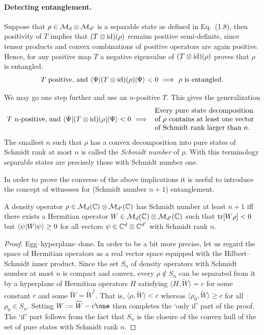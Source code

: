 \documentclass[11pt,a4paper]{article}
\numberwithin{equation}{section}
\begin{document}
\paragraph{Detecting entanglement.}
Suppose that $\rho\in \mathcal{M}_d\otimes \mathcal{M}_{d'}$ is a separable state as defined in Eq.~(1.8), then positivity of $T$
implies that $(T\otimes \mathrm{id})(\rho)$ remains positive semi-definite, since tensor products and convex combinations of
positive operators are again positive. Hence, for any positive map $T$ a negative eigenvalue of $(T\otimes \mathrm{id})(\rho)$
proves that $\rho$ is entangled:
\begin{equation}\label{eq:ch3:3.12}
    T\ \text{positive, and}\ \langle\Psi|(T\otimes \mathrm{id})(\rho)|\Psi\rangle<0 \ \Longrightarrow\ \rho\ \text{is entangled.}
\end{equation}

We may go one step further and use an $n$-positive $T$. This gives the generalization
\[
    T\ \text{$n$-positive, and}\ \bra{\Psi}(T\otimes \id)(\rho)\ket{\Psi}<0
    \ \Longrightarrow\
    \begin{array}{l}
        \text{Every pure state decomposition}         \\
        \text{of $\rho$ contains at least one vector} \\
        \text{of Schmidt rank larger than $n$.}
    \end{array}
\]
The smallest $n$ such that $\rho$ has a convex decomposition into pure states of Schmidt rank at most $n$ is called
the \emph{Schmidt number} of $\rho$. With this terminology separable states are precisely those with Schmidt number
one.

In order to prove the converse of the above implications it is useful to introduce the concept of witnesses for
(Schmidt number $n+1$) entanglement.

\begin{proposition}
    A density operator $\rho\in \mathcal{M}_d(\mathbb{C})\otimes \mathcal{M}_{d'}(\mathbb{C})$ has Schmidt number at least $n+1$ iff there exists a
    Hermitian operator $W\in \mathcal{M}_d(\mathbb{C})\otimes \mathcal{M}_{d'}(\mathbb{C})$ such that $\operatorname{tr}[W\rho]<0$ but
    $\langle\psi|W|\psi\rangle\ge 0$ for all vectors $\psi\in \mathbb{C}^d\otimes \mathbb{C}^{d'}$ with Schmidt rank $n$.
\end{proposition}

\begin{proof}
    Egg--hyperplane--done. In order to be a bit more precise, let us regard the space of Hermitian operators as a real
    vector space equipped with the Hilbert--Schmidt inner product. Since the set $S_n$ of density operators with Schmidt
    number at most $n$ is compact and convex, every $\rho\notin S_n$ can be separated from it by a hyperplane of Hermitian
    operators $H$ satisfying $\langle H,\widetilde W\rangle=c$ for some constant $c$ and some $\widetilde W=\widetilde
        W^\dagger$. That is, $\langle \rho,\widetilde W\rangle<c$ whereas $\langle \rho_0,\widetilde W\rangle\ge c$ for all
    $\rho_0\in S_n$. Setting $W:=\widetilde W-c\one$ then completes the `only if' part of the proof. The `if' part follows
    from the fact that $S_n$ is the closure of the convex hull of the set of pure states with Schmidt rank $n$.
\end{proof}
\end{document}
